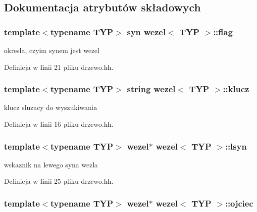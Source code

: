 \subsection{\-Dokumentacja atrybutów składowych}
\hypertarget{classwezel_afdf37f0bdec8aad5a7bdb490ac12f6f1}{
\subsubsection[{flag}]{\setlength{\rightskip}{0pt plus 5cm}template$<$typename \-T\-Y\-P$>$ {\bf syn} {\bf wezel}$<$ \-T\-Y\-P $>$\-::{\bf flag}}}\label{classwezel_afdf37f0bdec8aad5a7bdb490ac12f6f1}


okresla, czyim synem jest wezel 



\-Definicja w linii 21 pliku drzewo.\-hh.

\hypertarget{classwezel_ada78704962c0e466156d3175b6cf9228}{
\subsubsection[{klucz}]{\setlength{\rightskip}{0pt plus 5cm}template$<$typename \-T\-Y\-P$>$ string {\bf wezel}$<$ \-T\-Y\-P $>$\-::{\bf klucz}}}\label{classwezel_ada78704962c0e466156d3175b6cf9228}


klucz sluzacy do wyszukiwania 



\-Definicja w linii 16 pliku drzewo.\-hh.

\hypertarget{classwezel_aea9a623088a96fc878c52ac35625f961}{
\subsubsection[{lsyn}]{\setlength{\rightskip}{0pt plus 5cm}template$<$typename \-T\-Y\-P$>$ {\bf wezel}$\ast$ {\bf wezel}$<$ \-T\-Y\-P $>$\-::{\bf lsyn}}}\label{classwezel_aea9a623088a96fc878c52ac35625f961}


wskaznik na lewego syna wezla 



\-Definicja w linii 25 pliku drzewo.\-hh.

\hypertarget{classwezel_a85d0d08cd058b7ba0546c31e7cb464b0}{
\subsubsection[{ojciec}]{\setlength{\rightskip}{0pt plus 5cm}template$<$typename \-T\-Y\-P$>$ {\bf wezel}$\ast$ {\bf wezel}$<$ \-T\-Y\-P $>$\-::{\bf ojciec}}}\label{classwezel_a85d0d08cd058b7ba0546c31e7cb464b0}


